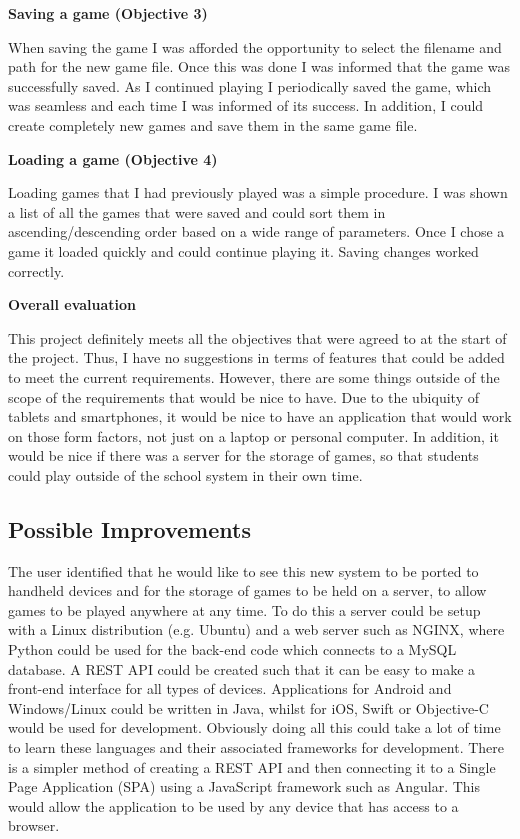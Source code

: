 \textbf{Saving a game (Objective 3)}

When saving the game I was afforded the opportunity to select the filename and path for the new game file. Once this was done I was informed that the game was successfully saved. As I continued playing I periodically saved the game, which was seamless and each time I was informed of its success. In addition, I could create completely new games and save them in the same game file.

\textbf{Loading a game (Objective 4)}

Loading games that I had previously played was a simple procedure. I was shown a list of all the games that were saved and could sort them in ascending/descending order based on a wide range of parameters. Once I chose a game it loaded quickly and could continue playing it. Saving changes worked correctly.

\textbf{Overall evaluation}

This project definitely meets all the objectives that were agreed to at the start of the project. Thus, I have no suggestions in terms of features that could be added to meet the current requirements. However, there are some things outside of the scope of the requirements that would be nice to have. Due to the ubiquity of tablets and smartphones, it would be nice to have an application that would work on those form factors, not just on a laptop or personal computer. In addition, it would be nice if there was a server for the storage of games, so that students could play outside of the school system in their own time.
\subsection{Possible Improvements}
The user identified that he would like to see this new system to be ported to handheld devices and for the storage of games to be held on a server, to allow games to be played anywhere at any time. To do this a server could be setup with a Linux distribution (e.g. Ubuntu) and a web server such as NGINX, where Python could be used for the back-end code which connects to a MySQL database. A REST API could be created such that it can be easy to make a front-end interface for all types of devices. Applications for Android and Windows/Linux could be written in Java, whilst for iOS, Swift or Objective-C would be used for development. Obviously doing all this could take a lot of time to learn these languages and their associated frameworks for development. There is a simpler method of creating a REST API and then connecting it to a Single Page Application (SPA) using a JavaScript framework such as Angular. This would allow the application to be used by any device that has access to a browser.

